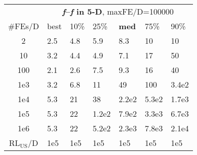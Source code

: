 \begin{tabular}{c|llllll}
 & \multicolumn{6}{|c}{\textbf{\textit{f}\raisebox{-0.35ex}{1}--\textit{f}\raisebox{-0.35ex}{24} in 5-D}, maxFE/D=100000}\\
\#FEs/D & best & 10\% & 25\% & \textbf{med} & 75\% & 90\%\\
2 & \hspace*{1ex}2.5 & \hspace*{1ex}4.8 & \hspace*{1ex}5.9 & \hspace*{1ex}8.3 & 10 & 10\\
10 & \hspace*{1ex}3.2 & \hspace*{1ex}4.4 & \hspace*{1ex}4.9 & \hspace*{1ex}7.1 & 17 & 50\\
100 & \hspace*{1ex}2.1 & \hspace*{1ex}2.6 & \hspace*{1ex}7.5 & \hspace*{1ex}9.3 & 16 & 40\\
1e3 & \hspace*{1ex}3.2 & \hspace*{1ex}6.8 & 11 & 49 & 100 & 3.4e2\\
1e4 & \hspace*{1ex}5.3 & 21 & 38 & 2.2e2 & 5.3e2 & 1.7e3\\
1e5 & \hspace*{1ex}5.3 & 22 & 1.2e2 & 7.9e2 & 3.3e3 & 6.7e3\\
1e6 & \hspace*{1ex}5.3 & 22 & 5.2e2 & 2.3e3 & 7.8e3 & 2.1e4\\
$\text{RL}_{\text{US}}$/D & 1e5 & 1e5 & 1e5 & 1e5 & 1e5 & 1e5
\end{tabular}
